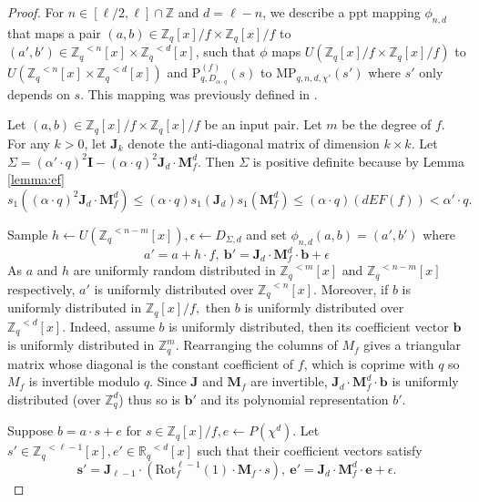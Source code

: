 \documentclass[11pt]{article}
\newcommand{\poly}[2]{{#1}^{<#2}[x]}
\newcommand{\Z}{\mathbb{Z}}
\newcommand{\R}{\mathbb{R}}
\newcommand{\MP}[3]{\text{MP}_{q,#1,#2,#3}}
\begin{document}
\begin{proof}
For $n \in [\ell/2, \ell]\cap \Z$ and $d=\ell -n$, we describe a ppt mapping $\phi_{n,d}$ that maps a pair $(a, b) \in \Z_q[x]/f \times \Z_q[x]/f$ to $(a',b')\in \poly{\Z_q}{n} \times \poly{\Z_q}{d}$, such that $\phi$ maps $U(\Z_q[x]/f \times \Z_q[x]/f)$ to $U(\poly{\Z_q}{n} \times \poly{\Z_q}{d})$ and $\text{P}_{q,D_{\alpha\cdot q} }^{(f)}(s)$ to $\MP{n}{d}{\chi'}(s')$ where $s'$ only depends on $s.$ This mapping was previously defined in \cite{MPLWE}.

Let $(a, b) \in \Z_q[x]/f \times \Z_q[x]/f$ be an input pair. Let $m$ be the degree of $f$. For any $k>0$, let $\textbf{J}_k$ denote the anti-diagonal matrix of dimension $k \times k$. Let $\Sigma = ( \alpha' \cdot q)^2 \textbf{I} - (\alpha \cdot q)^2 \textbf{J}_d \cdot \textbf{M}^d_f .$ %
Then $\Sigma $ is positive definite because by Lemma \ref{lemma:ef} $s_1((\alpha \cdot q)^2 \textbf{J}_d \cdot \textbf{M}^d_f)\leq (\alpha\cdot q) s_1( \textbf{J}_d  ) s_1(\textbf{M}^d_f) \leq (\alpha \cdot q)  (d EF(f)) < \alpha'\cdot q.$ 

Sample $h \leftarrow U(\poly{\Z_q}{n-m}), \epsilon\leftarrow D_{\Sigma,d} $ and set $\phi_{n,d} (a, b) = (a', b')$ where
$$a' = a + h \cdot f , \> \textbf{b}' =\textbf{J}_d \cdot  \textbf{M}^{d}_f \cdot \textbf{b}  + \epsilon$$
As $a$ and $h$ are uniformly random distributed in $\poly{\Z_q}{m}$ and $\poly{\Z_q}{n-m}$ respectively, $a'$ is uniformly distributed over $\poly{\Z_q}{n}.$ Moreover, if $b$ is uniformly distributed in $\Z_q[x]/f,$ then $b$ is uniformly distributed over $\poly{\Z_q}{d}.$ Indeed, assume $b$ is uniformly distributed, then its coefficient vector $\textbf{b}$ is uniformly distributed in $\Z_q^m.$ Rearranging the columns of $M_f$ gives a triangular matrix whose diagonal is the constant coefficient of $f$, which is coprime with $q$ so $M_f$ is invertible modulo $q.$ Since $\textbf{J}$ and $\textbf{M}_f$ are invertible, $\textbf{J}_d \cdot  \textbf{M}^{d}_f \cdot \textbf{b} $ is uniformly distributed (over $\Z_q^d$) thus so is $ \textbf{b}'$ and its polynomial representation $b'$.

Suppose $b = a \cdot s + e$ for $s\in \Z_q[x]/f, e \leftarrow P(\chi^d).$ Let $s'\in \poly{\Z_q}{\ell-1}, e'\in \poly{\R_q}{d}$ such that their coefficient vectors satisfy
$$ \textbf{s}'= \textbf{J}_{\ell-1} \cdot( \text{Rot}^{\ell-1}_f (1) \cdot \textbf{M}_f \cdot s), \> \textbf{e}' = \textbf{J}_d \cdot \textbf{M}^d_f \cdot \textbf{e} + \epsilon.$$


\end{proof}
\end{document}
